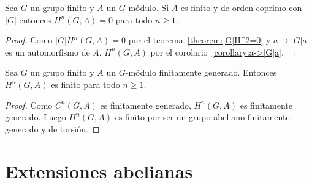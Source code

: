 \begin{corollary}
	\label{corollary:H^n=0}
	Sea $G$ un grupo finito y $A$ un $G$-módulo. Si $A$ es finito y de orden
	coprimo con $|G|$ entonces $H^n(G,A)=0$ para todo $n\geq1$. 
\end{corollary}

\begin{proof}
	Como $|G|H^n(G,A)=0$ por el teorema~\ref{theorem:|G|H^2=0} y $a\mapsto
	|G|a$ es un automorfismo de $A$, $H^n(G,A)$ por el
	corolario~\ref{corollary:a->|G|a}.
\end{proof}

\begin{corollary}
	Sea $G$ un grupo finito y $A$ un $G$-módulo finitamente generado.  Entonces
	$H^n(G,A)$ es finito para todo $n\geq1$. 	
\end{corollary}

\begin{proof}
	Como $C^n(G,A)$ es finitamente generado, $H^n(G,A)$ es finitamente
	generado.  Luego $H^n(G,A)$ es finito por ser un grupo abeliano finitamente
	generado y de torsión.
\end{proof}

\section*{Extensiones abelianas}

